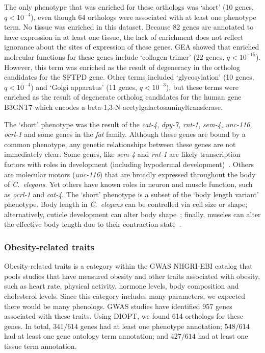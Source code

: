 \documentclass[10pt, onecolumn]{article}
\newcommand{\cel}{\emph{C.~elegans}}
\newcommand{\hobesity}{957}
\newcommand{\wobesity}{614}
\newcommand{\qval}[1]{\ensuremath{q<10^{-#1}}}
\begin{document}
The only phenotype that was enriched for these orthologs was `short' (10 genes,
\qval{4}), even though 64 orthologs were associated with at least one phenotype
term. No tissue was enriched in this dataset. Because 82 genes are annotated to
have expression in at least one tissue, the lack of enrichment does not reflect
ignorance about the sites of expression of these genes. GEA showed that enriched
molecular functions for these genes include `collagen trimer' (22 genes,
\qval{15}). However, this term was enriched as the result of degeneracy in the
ortholog candidates for the SFTPD gene. Other terms included `glycosylation' (10
genes, \qval{4}) and `Golgi apparatus' (11 genes, \qval{3}), but these terms
were enriched as the result of degenerate ortholog candidates for the human gene
B3GNT7 which encodes a beta-1,3-N-acetylgalactosaminyltransferase.

The `short' phenotype was the result of the \emph{cat-4}, \emph{dpy-7},
\emph{rnt-1}, \emph{sem-4}, \emph{unc-116}, \emph{ocrl-1} and some genes in the
\emph{fat} family. Although these genes are bound by a common phenotype, any
genetic relationships between these genes are not immediately clear. Some genes,
like \emph{sem-4} and \emph{rnt-1} are likely transcription factors with roles
in development (including hypodermal development)~\cite{Desai1988,Ji2004}.
Others are molecular motors (\emph{unc-116}) that are broadly expressed
throughout the body of \cel{}. Yet others have known roles in neuron and muscle
function, such as \emph{ocrl-1} and \emph{cat-4}. The `short' phenotype is a
subset of the `body length variant' phenotype. Body length in \cel{} can be
controlled via cell size or shape\cite{Wang2002,Nakano2004}; alternatively,
cuticle development can alter body shape~\cite{Cox1980,Kramer1988}; finally,
muscles can alter the effective body length due to their contraction
state~\cite{Lewis1980}.


\subsubsection*{Obesity-related traits}
Obesity-related traits is a category within the GWAS NHGRI-EBI catalog that
pools studies that have measured obesity and other traits associated with
obesity, such as heart rate, physical activity, hormone levels, body composition
and cholesterol levels. Since this category includes many parameters, we
expected there would be many phenologs. GWAS studies have identified \hobesity{}
genes associated with these traits. Using DIOPT, we found \wobesity{} orthologs
for these genes. In total, $341/\wobesity{}$ genes had at least one phenotype
annotation; $548/\wobesity{}$ had at least one gene ontology term annotation;
and $427/\wobesity{}$ had at least one tissue term annotation.
\end{document}
